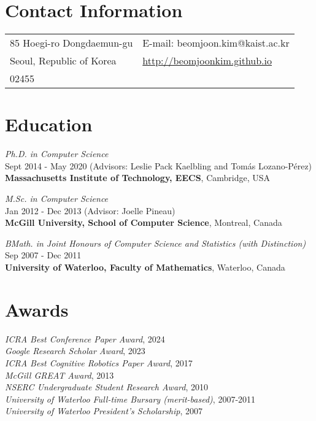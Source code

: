\documentclass[line,margin,letterpaper]{res}
\begin{document}
\newcommand{\sth}[0]{$^{\textrm{th}}$ }



\begin{resume}
\section{Contact Information}
\hspace{-10px}
\begin{tabular}{ll}
85 Hoegi-ro Dongdaemun-gu & E-mail: beomjoon.kim@kaist.ac.kr\\
Seoul, Republic of Korea& \small{\url{http://beomjoonkim.github.io}}\\
02455 & \\
\end{tabular}


\section{Education}
{\sl Ph.D. in Computer Science} \\Sept 2014 - May 2020 (Advisors: Leslie Pack Kaelbling
and Tom\'as Lozano-P\'erez)\\
\textbf{Massachusetts Institute of Technology, EECS}, Cambridge, USA


{\sl M.Sc. in Computer Science} \\Jan 2012 - Dec 2013 (Advisor: Joelle Pineau)\\
\textbf{McGill University, School of Computer Science}, Montreal, Canada

{\sl BMath. in Joint Honours of Computer Science and Statistics (with Distinction)} \\Sep 2007 - Dec 2011\\
\textbf{University of Waterloo, Faculty of Mathematics}, Waterloo, Canada



\section{Awards}
{\sl ICRA Best Conference Paper Award}, 2024
\\
{\sl Google Research Scholar Award}, 2023
\\
{\sl ICRA Best Cognitive Robotics Paper Award}, 2017
\\
{\sl McGill GREAT Award}, 2013
\\
{\sl NSERC Undergraduate Student Research Award}, 2010
\\
{\sl University of Waterloo Full-time Bursary (merit-based)}, 2007-2011
\\
{\sl University of Waterloo President's Scholarship}, 2007



\end{resume}
\end{document}
